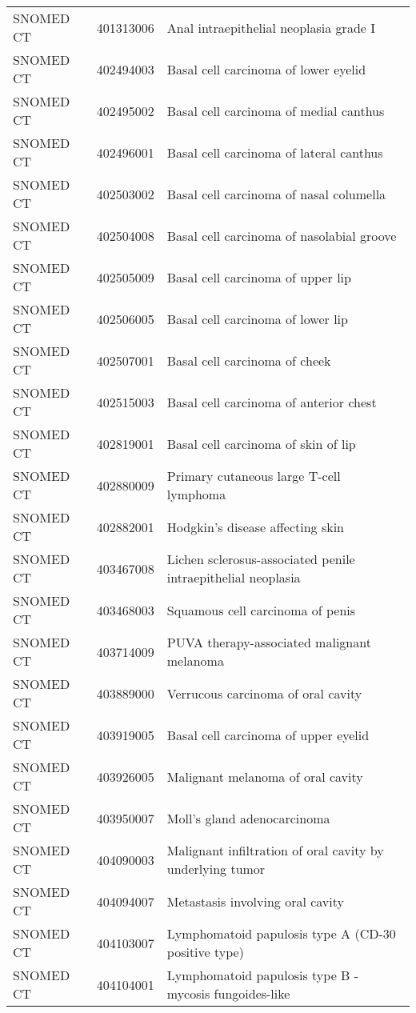 \begin{longtable}{p{}p{}p{}}
  SNOMED CT & 401313006 & Anal intraepithelial neoplasia grade I \\ 
  SNOMED CT & 402494003 & Basal cell carcinoma of lower eyelid \\ 
  SNOMED CT & 402495002 & Basal cell carcinoma of medial canthus \\ 
  SNOMED CT & 402496001 & Basal cell carcinoma of lateral canthus \\ 
  SNOMED CT & 402503002 & Basal cell carcinoma of nasal columella \\ 
  SNOMED CT & 402504008 & Basal cell carcinoma of nasolabial groove \\ 
  SNOMED CT & 402505009 & Basal cell carcinoma of upper lip \\ 
  SNOMED CT & 402506005 & Basal cell carcinoma of lower lip \\ 
  SNOMED CT & 402507001 & Basal cell carcinoma of cheek \\ 
  SNOMED CT & 402515003 & Basal cell carcinoma of anterior chest \\ 
  SNOMED CT & 402819001 & Basal cell carcinoma of skin of lip \\ 
  SNOMED CT & 402880009 & Primary cutaneous large T-cell lymphoma \\ 
  SNOMED CT & 402882001 & Hodgkin's disease affecting skin \\ 
  SNOMED CT & 403467008 & Lichen sclerosus-associated penile intraepithelial neoplasia \\ 
  SNOMED CT & 403468003 & Squamous cell carcinoma of penis \\ 
  SNOMED CT & 403714009 & PUVA therapy-associated malignant melanoma \\ 
  SNOMED CT & 403889000 & Verrucous carcinoma of oral cavity \\ 
  SNOMED CT & 403919005 & Basal cell carcinoma of upper eyelid \\ 
  SNOMED CT & 403926005 & Malignant melanoma of oral cavity \\ 
  SNOMED CT & 403950007 & Moll's gland adenocarcinoma \\ 
  SNOMED CT & 404090003 & Malignant infiltration of oral cavity by underlying tumor \\ 
  SNOMED CT & 404094007 & Metastasis involving oral cavity \\ 
  SNOMED CT & 404103007 & Lymphomatoid papulosis type A (CD-30 positive type) \\ 
  SNOMED CT & 404104001 & Lymphomatoid papulosis type B - mycosis fungoides-like \\ 

\end{longtable}
